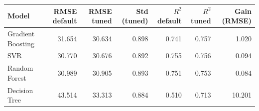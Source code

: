 \begin{tabular}{lrrrrrr}
\toprule
Model & RMSE default & RMSE tuned & Std (tuned) & $R^2$ default & $R^2$ tuned & Gain (RMSE) \\
\midrule
Gradient Boosting & 31.654 & 30.634 & 0.898 & 0.741 & 0.757 & 1.020 \\
SVR & 30.770 & 30.676 & 0.892 & 0.755 & 0.756 & 0.094 \\
Random Forest & 30.989 & 30.905 & 0.893 & 0.751 & 0.753 & 0.084 \\
Decision Tree & 43.514 & 33.313 & 0.884 & 0.510 & 0.713 & 10.201 \\
\bottomrule
\end{tabular}
